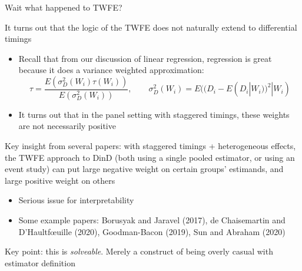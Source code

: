 \documentclass[notes,11pt, aspectratio=169]{beamer}
\newenvironment{wideitemize}{\itemize\addtolength{\itemsep}{10pt}}{\enditemize}
\begin{document}
\begin{frame}{Wait what happened to TWFE?}
  \begin{wideitemize}
  \item It turns out that the logic of the TWFE does not naturally extend to differential timings
    \begin{itemize}
    \item Recall that from our discussion of linear regression, regression is great because it does a variance weighted approximation:
      \begin{equation*}
        \tau = \frac{E(\sigma^{2}_{D}(W_{i})\tau(W_{i}))}{E(\sigma^{2}_{D}(W_{i}))}, \qquad \sigma^{2}_{D}(W_{i}) = E((D_{i} - E(D_{i}|W_{i}))^{2} | W_{i})
      \end{equation*}
  \item It turns out that in the panel setting with staggered timings,
    these weights are not necessarily positive
  \end{itemize}
\item Key insight from several papers: with staggered timings +
    heterogeneous effects, the TWFE approach to DinD (both using a
    single pooled estimator, or using an event study) can put large
    negative weight on certain groups' estimands, and large positive
    weight on others
    \begin{itemize}
    \item Serious issue for interpretability
    \item Some example papers: Borusyak and Jaravel (2017), de
      Chaisemartin and D’Haultfœuille (2020), Goodman-Bacon (2019),
      Sun and Abraham (2020)
    \end{itemize}
  \item Key point: this is \emph{solveable}. Merely a construct of
    being overly casual with estimator definition
  \end{wideitemize}
\end{frame}
\end{document}

